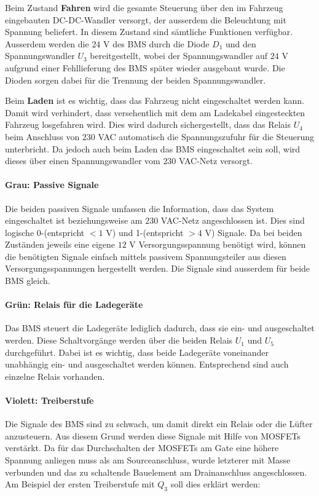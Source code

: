 Beim Zustand \textbf{Fahren} wird die gesamte Steuerung über den im Fahrzeug eingebauten DC-DC-Wandler versorgt, der ausserdem die Beleuchtung mit Spannung beliefert. In diesem Zustand sind sämtliche Funktionen verfügbar. Ausserdem werden die $24$ V des BMS durch die Diode $D_1$ und den Spannungswandler $U_3$ bereitgestellt, wobei der Spannungswandler auf $24$ V aufgrund einer Fehllieferung des BMS später wieder ausgebaut wurde. Die Dioden sorgen dabei für die Trennung der beiden Spannungswandler.

Beim \textbf{Laden} ist es wichtig, dass das Fahrzeug nicht eingeschaltet werden kann. Damit wird verhindert, dass versehentlich mit dem am Ladekabel eingesteckten Fahrzeug losgefahren wird. Dies wird dadurch sichergestellt, dass das Relais $U_4$ beim Anschluss von $230$ VAC automatisch die Spannungszufuhr für die Steuerung unterbricht. Da jedoch auch beim Laden das BMS eingeschaltet sein soll, wird dieses über einen Spannungswandler vom $230$ VAC-Netz versorgt.

\paragraph{Grau: Passive Signale}
Die beiden passiven Signale umfassen die Information, dass das System eingeschaltet ist beziehungsweise am $230$ VAC-Netz angeschlossen ist. Dies sind logische 0-(entspricht $<1$ V) und 1-(entspricht $>4$ V) Signale. Da bei beiden Zuständen jeweils eine eigene $12$ V Versorgungsspannung benötigt wird, können die benötigten Signale einfach mittels passivem Spannungsteiler aus diesen Versorgungsspannungen hergestellt werden. Die Signale sind ausserdem für beide BMS gleich.

\paragraph{Grün: Relais für die Ladegeräte}
Das BMS steuert die Ladegeräte lediglich dadurch, dass sie ein- und ausgeschaltet werden. Diese Schaltvorgänge werden über die beiden Relais $U_1$ und $U_5$ durchgeführt. Dabei ist es wichtig, dass beide Ladegeräte voneinander unabhängig ein- und ausgeschaltet werden können. Entsprechend sind auch einzelne Relais vorhanden.

\paragraph{Violett: Treiberstufe}
Die Signale des BMS sind zu schwach, um damit direkt ein Relais oder die Lüfter anzusteuern. Aus diesem Grund werden diese Signale mit Hilfe von MOSFETs verstärkt. Da für das Durchschalten der MOSFETs am Gate eine höhere Spannung anliegen muss als am Sourceanschluss, wurde letzterer mit Masse verbunden und das zu schaltende Bauelement am Drainanschluss angeschlossen. Am Beispiel der ersten Treiberstufe mit $Q_3$ soll dies erklärt werden:

